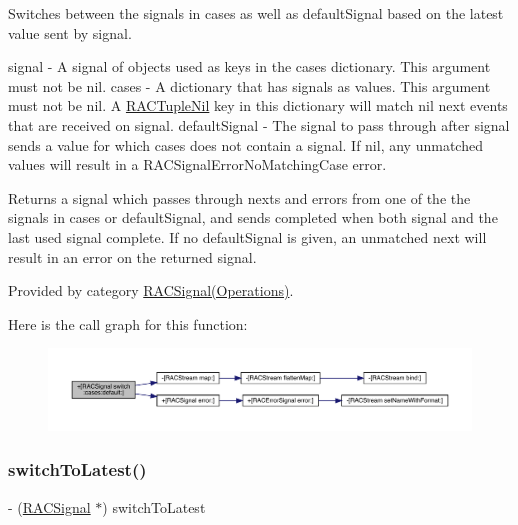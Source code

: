 Switches between the signals in {\ttfamily cases} as well as {\ttfamily default\+Signal} based on the latest value sent by {\ttfamily signal}.

signal -\/ A signal of objects used as keys in the {\ttfamily cases} dictionary. This argument must not be nil. cases -\/ A dictionary that has signals as values. This argument must not be nil. A \mbox{\hyperlink{interface_r_a_c_tuple_nil}{R\+A\+C\+Tuple\+Nil}} key in this dictionary will match nil {\ttfamily next} events that are received on {\ttfamily signal}. default\+Signal -\/ The signal to pass through after {\ttfamily signal} sends a value for which {\ttfamily cases} does not contain a signal. If nil, any unmatched values will result in a R\+A\+C\+Signal\+Error\+No\+Matching\+Case error.

Returns a signal which passes through {\ttfamily next}s and {\ttfamily error}s from one of the the signals in {\ttfamily cases} or {\ttfamily default\+Signal}, and sends {\ttfamily completed} when both {\ttfamily signal} and the last used signal complete. If no {\ttfamily default\+Signal} is given, an unmatched {\ttfamily next} will result in an error on the returned signal. 

Provided by category \mbox{\hyperlink{category_r_a_c_signal_07_operations_08_aac7816b22cfdcbe65cd43d99836ba1f5}{R\+A\+C\+Signal(\+Operations)}}.

Here is the call graph for this function\+:\nopagebreak
\begin{figure}[H]
\begin{center}
\leavevmode
\includegraphics[width=350pt]{interface_r_a_c_signal_aac7816b22cfdcbe65cd43d99836ba1f5_cgraph}
\end{center}
\end{figure}
\mbox{\label{interface_r_a_c_signal_a0a6780c4580e1a5338a9a891f7c69ea1}} 
\subsubsection{\texorpdfstring{switch\+To\+Latest()}{switchToLatest()}\hspace{0.1cm}{\footnotesize\ttfamily [1/3]}}
{\footnotesize\ttfamily -\/ (\mbox{\hyperlink{interface_r_a_c_signal}{R\+A\+C\+Signal}} $\ast$) switch\+To\+Latest \begin{DoxyParamCaption}{ }\end{DoxyParamCaption}}

